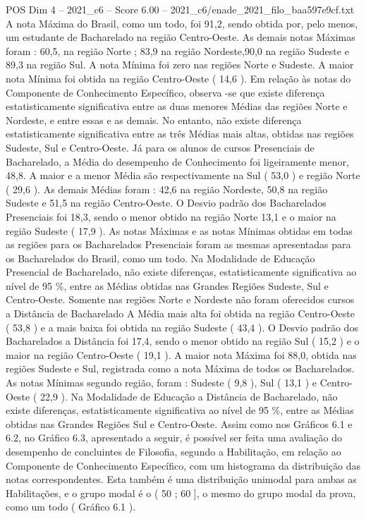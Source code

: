 \begin{textsample}{POS Dim 4 – 2021\_c6 – Score 6.00 – 2021\_c6/enade\_2021\_filo\_baa597e9cf.txt}
A nota Máxima do Brasil, como um todo, foi 91,2, sendo obtida por, pelo menos, um estudante de Bacharelado na região Centro-Oeste.
As demais notas Máximas foram : 60,5, na região Norte ; 83,9 na região Nordeste,90,0 na região Sudeste e 89,3 na região Sul.
A nota Mínima foi zero nas regiões Norte e Sudeste.
A maior nota Mínima foi obtida na região Centro-Oeste ( 14,6 ).
Em relação às notas do Componente de Conhecimento Específico, observa -se que existe diferença estatisticamente significativa entre as duas menores Médias das regiões Norte e Nordeste, e entre essas e as demais.
No entanto, não existe diferença estatisticamente significativa entre as três Médias mais altas, obtidas nas regiões Sudeste, Sul e Centro-Oeste.
Já para os alunos de cursos Presenciais de Bacharelado, a Média do desempenho de Conhecimento foi ligeiramente menor, 48,8.
A maior e a menor Média são respectivamente na Sul ( 53,0 ) e região Norte ( 29,6 ).
As demais Médias foram : 42,6 na região Nordeste, 50,8 na região Sudeste e 51,5 na região Centro-Oeste.
O Desvio padrão dos Bacharelados Presenciais foi 18,3, sendo o menor obtido na região Norte 13,1 e o maior na região Sudeste ( 17,9 ).
As notas Máximas e as notas Mínimas obtidas em todas as regiões para os Bacharelados Presenciais foram as mesmas apresentadas para os Bacharelados do Brasil, como um todo.
Na Modalidade de Educação Presencial de Bacharelado, não existe diferenças, estatisticamente significativa ao nível de 95 \%, entre as Médias obtidas nas Grandes Regiões Sudeste, Sul e Centro-Oeste.
Somente nas regiões Norte e Nordeste não foram oferecidos cursos a Distância de Bacharelado A Média mais alta foi obtida na região Centro-Oeste ( 53,8 ) e a mais baixa foi obtida na região Sudeste ( 43,4 ).
O Desvio padrão dos Bacharelados a Distância foi 17,4, sendo o menor obtido na região Sul ( 15,2 ) e o maior na região Centro-Oeste ( 19,1 ).
A maior nota Máxima foi 88,0, obtida nas regiões Sudeste e Sul, registrada como a nota Máxima de todos os Bacharelados.
As notas Mínimas segundo região, foram : Sudeste ( 9,8 ), Sul ( 13,1 ) e Centro-Oeste ( 22,9 ).
Na Modalidade de Educação a Distância de Bacharelado, não existe diferenças, estatisticamente significativa ao nível de 95 \%, entre as Médias obtidas nas Grandes Regiões Sul e Centro-Oeste.
Assim como nos Gráficos 6.1 e 6.2, no Gráfico 6.3, apresentado a seguir, é possível ser feita uma avaliação do desempenho de concluintes de Filosofia, segundo a Habilitação, em relação ao Componente de Conhecimento Específico, com um histograma da distribuição das notas correspondentes.
Esta também é uma distribuição unimodal para ambas as Habilitações, e o grupo modal é o ( 50 ; 60 ], o mesmo do grupo modal da prova, como um todo ( Gráfico 6.1 ).

\end{textsample}
